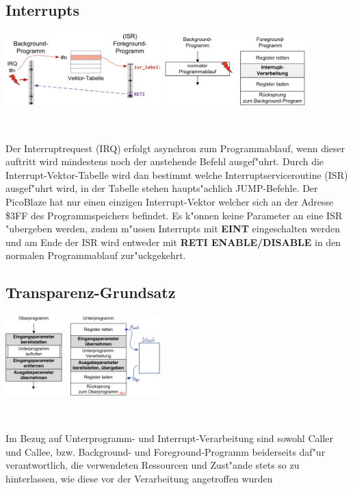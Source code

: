 \subsection{Interrupts}
\begin{minipage}{10cm}
	\includegraphics[width=6cm]{pics/Interrupt_Call}
	\includegraphics[width=5.5cm]{pics/Interrupt-Ablauf}
\end{minipage}
%
\begin{minipage}{0.5cm}
	\ \
\end{minipage}
%
\begin{minipage}{8cm}
	Der Interruptrequest (IRQ) erfolgt asynchron zum Programmablauf, wenn dieser auftritt wird mindestens noch der anstehende Befehl ausgef"uhrt. Durch die Interrupt-Vektor-Tabelle wird dan bestimmt welche Interruptserviceroutine (ISR) ausgef"uhrt wird, in der Tabelle stehen haupts"achlich JUMP-Befehle. Der PicoBlaze hat nur einen einzigen Interrupt-Vektor welcher sich an der Adresse \$3FF des Programmspeichers befindet. Es k"onnen keine Parameter an eine ISR "ubergeben werden, zudem m"ussen Interrupts mit \textbf{EINT} eingeschalten werden und am Ende der ISR wird entweder mit \textbf{RETI ENABLE/DISABLE} in den normalen Programmablauf zur"uckgekehrt.
\end{minipage}

\subsection{Transparenz-Grundsatz}
\begin{minipage}{10cm}
	\includegraphics[width=6cm]{pics/Transparenz-Grundsatz}
\end{minipage}
%
\begin{minipage}{0.5cm}
	\ \
\end{minipage}
%
\begin{minipage}{8cm}
	Im Bezug auf Unterprogramm- und Interrupt-Verarbeitung sind sowohl Caller und Callee, bzw. Background- und Foreground-Programm beiderseits daf"ur verantwortlich, die verwendeten Ressourcen und Zust"ande stets so zu hinterlassen, wie diese vor der Verarbeitung angetroffen wurden
\end{minipage}

